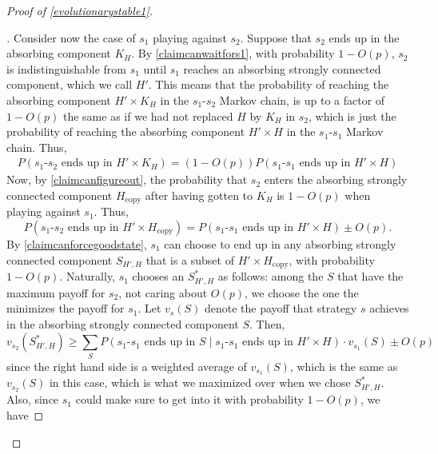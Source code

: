 \documentclass[11pt]{amsart}
\theoremstyle{definition}
\theoremstyle{remark}
\newenvironment{subproof}[1][\proofname]{%
  \renewcommand{\qedsymbol}{$\blacksquare$}%
  \begin{proof}[#1]%
}{%
  \end{proof}%
}
\begin{document}
\begin{proof}[Proof of \cref{evolutionarystable1}]
\begin{subproof}
        Consider now the case of $s_1$ playing against $s_2$. Suppose that $s_2$ ends up in the absorbing component $K_H$. By \cref{claimcanwaitfors1}, with probability $1 - O(p)$, $s_2$ is indistinguishable from $s_1$ until $s_1$ reaches an absorbing strongly connected component, which we call $H'$.         
        This means that the probability of reaching the absorbing component $H' \times K_H$ in the $s_1$-$s_2$ Markov chain, is up to a factor of $1 - O(p)$ the same as if we had not replaced $H$ by $K_H$ in $s_2$, which is just the probability of reaching the absorbing component $H' \times H$ in the $s_1$-$s_1$ Markov chain. Thus, 
        \begin{multline*}
          P(\text{$s_1$-$s_2$ ends up in $H' \times K_H$}) = (1 - O(p)) P(\text{$s_1$-$s_1$ ends up in $H' \times H$})
        \end{multline*}
        Now, by \cref{claimcanfigureout}, the probability that $s_2$ enters the absorbing strongly connected component $H_\text{copy}$ after having gotten to $K_H$ is $1 - O(p)$ when playing against $s_1$. Thus,
        \begin{equation}
          \label{equationhhcopy}
          P(\text{$s_1$-$s_2$ ends up in $H' \times H_\text{copy}$}) = P(\text{$s_1$-$s_1$ ends up in $H' \times H$}) \pm O(p).
        \end{equation}
        By \cref{claimcanforcegoodstate}, $s_1$ can choose to end up in any absorbing strongly connected component $S_{H', H}$ that is a subset of $H' \times H_\text{copy}$, with probability $1 - O(p)$. 
        Naturally, $s_1$ chooses an $S_{H', H}^*$ as follows: among the $S$ that have the maximum payoff for $s_2$, not caring about $O(p)$, we choose the one the minimizes the payoff for $s_1$.
        Let $v_{s}(S)$ denote the payoff that strategy $s$ achieves in the absorbing strongly connected component $S$. Then,
        \begin{equation}
          \label{imtoootired}
          v_{s_2}(S_{H', H}^*) \geq \sum_{S} P(\text{$s_1$-$s_1$ ends up in $S$} \mid \text{$s_1$-$s_1$ ends up in $H' \times H$}) \cdot v_{s_1}(S) \pm O(p)
        \end{equation}
        since the right hand side is a weighted average of $v_{s_1}(S)$, which is the same as $v_{s_2}(S)$ in this case, which is what we maximized over when we chose $S_{H', H}^*$. Also, since $s_1$ could make sure to get into it with probability $1 - O(p)$, we have 

\end{subproof}
\end{proof}
\end{document}
